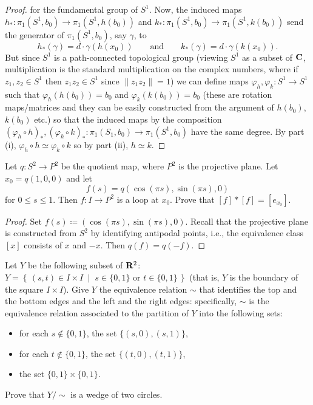 \begin{proof}
for the fundamental group of $S^1$. Now, the induced maps
$h_*\colon\pi_1(S^1,b_0)\to\pi_1(S^1,h(b_0))$ and
$k_*\colon\pi_1(S^1,b_0)\to\pi_1(S^1,k(b_0))$ send the generator of
$\pi_1(S^1,b_0)$, say $\gamma$, to
\[
h_*(\gamma)=d\cdot\gamma(h(x_0))\qquad\text{and}\qquad
k_*(\gamma)=d\cdot\gamma(k(x_0)).
\]
But since $S^1$ is a path-connected topological group (viewing $S^1$ as a
subset of $\mathbf{C}$, multiplication is the standard multiplication on the
complex numbers, where if $z_1,z_2\in S^1$ then $z_1z_2\in S^1$ since
$\|z_1z_2\|=1$) we can define maps $\varphi_h,\varphi_k\colon S^1\to S^1$
such that $\varphi_h(h(b_0))=b_0$ and $\varphi_k(k(b_0))=b_0$ (these are
rotation maps/matrices and they can be easily constructed from the argument
of $h(b_0)$, $k(b_0)$ etc.) so that the induced maps by the composition
$(\varphi_h\circ h)_*,(\varphi_k\circ
k)_*\colon\pi_1(S_1,b_0)\to\pi_1(S^1,b_0)$ have the same degree. By part
(i), $\varphi_h\circ h\simeq\varphi_k\circ k$ so by part (ii), $h\simeq k$.
\end{proof}
\newpage
\begin{problem}[B]
Let $q\colon S^2\to P^2$ be the quotient map, where $P^2$ is the
projective plane. Let $x_0=q(1,0,0)$ and let
\[f(s)=q(\cos(\pi s),\sin(\pi s),0)\]
for $0\leq s\leq 1$. Then $f\colon I\to P^2$ is a loop at
$x_0$. Prove that $[f]*[f]=[e_{x_0}]$.
\end{problem}
\begin{proof}
Set $f(s)\coloneqq(\cos(\pi s),\sin(\pi s),0)$. Recall that the projective
plane is constructed from $S^2$ by identifying antipodal points, i.e., the
equivalence class $[x]$ consists of $x$ and $-x$. Then $q(f)=q(-f)$.
\end{proof}
\newpage
\begin{problem}[C]
Let $Y$ be the following subset of $\mathbf{R}^2$: $Y=\left\{\,(s,t)\in
  I\times I\;\middle|\;\text{$s\in\{0,1\}$ or
    $t\in\{0,1\}$}\,\right\}$ (that is, $Y$ is the boundary of
the square $I\times I$). Give $Y$ the equivalence relation $\sim$
that identifies the top and the bottom edges and the left and the
right edges: specifically, $\sim$ is the equivalence relation
associated to the partition of $Y$ into the following sets:
\begin{itemize}
\item for each $s\notin\{0,1\}$, the set $\{(s,0),(s,1)\}$,
\item for each $t\notin\{0,1\}$, the set $\{(t,0),(t,1)\}$,
\item the set $\{0,1\}\times\{0,1\}$.
\end{itemize}
Prove that $Y/\sim$ is a wedge of two circles.
\end{problem}
